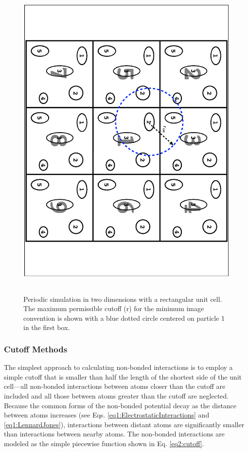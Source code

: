 \begin{figure}
   \includegraphics[height=6.5in, angle=90, trim=0.7cm 3cm 0.7cm 3cm, clip=true]
                   {PBC.ps}
   \caption[Periodic simulation in two dimensions with a rectangular unit cell.
            The maximum permissible cutoff (r) for the minimum image
            convention is shown]
           {Periodic simulation in two dimensions with a rectangular unit cell.
            The maximum permissible cutoff (r) for the minimum image
            convention is shown with a blue dotted circle centered on particle 1
            in the first box.}
   \label{fig2:PBC}
\end{figure}

\subsubsection{Cutoff Methods}

The simplest approach to calculating non-bonded interactions is to employ a
simple cutoff that is smaller than half the length of the shortest side of the
unit cell---\ie all non-bonded interactions between atoms closer than the cutoff
are included and all those between atoms greater than the cutoff are neglected.
Because the common forms of the non-bonded potential decay as the distance
between atoms increases (see Eqs. \ref{eq1:ElectrostaticInteractions} and
\ref{eq1:LennardJones}), interactions between distant atoms are significantly
smaller than interactions between nearby atoms. The non-bonded interactions are
modeled as the simple piecewise function shown in Eq. \ref{eq2:cutoff}.

